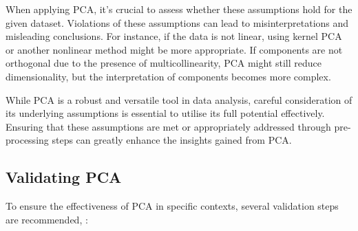 \documentclass[conference]{IEEEtran}
\begin{document}
When applying PCA, it's crucial to assess whether these assumptions hold for the given dataset. Violations of these assumptions can lead to misinterpretations and misleading conclusions. For instance, if the data is not linear, using kernel PCA or another nonlinear method might be more appropriate. If components are not orthogonal due to the presence of multicollinearity, PCA might still reduce dimensionality, but the interpretation of components becomes more complex.

While PCA is a robust and versatile tool in data analysis, careful consideration of its underlying assumptions is essential to utilise its full potential effectively. Ensuring that these assumptions are met or appropriately addressed through pre-processing steps can greatly enhance the insights gained from PCA.


\subsection{Validating PCA}

To ensure the effectiveness of PCA in specific contexts, several validation steps are recommended, \cite{bro2014principal, shlens2014tutorial, wold1987principal, candes2011robust, mckeown1998independent}:
\end{document}
